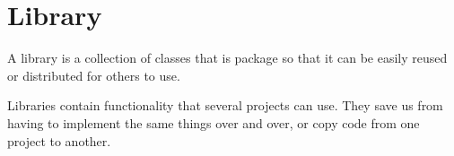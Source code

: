 \section{Library}

A library is a collection of classes that is package so that it can be easily reused or distributed for others to use.

Libraries contain functionality that several projects can use. They save us from having to implement the same things over and over, or copy code from one project to another.





